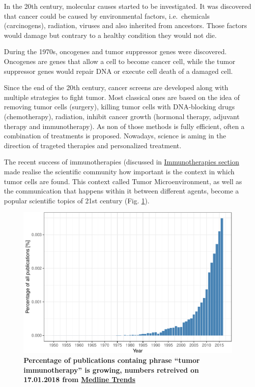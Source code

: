 \documentclass[12pt,]{book}
\theoremstyle{definition}
\theoremstyle{definition}
\theoremstyle{definition}
\theoremstyle{remark}
\begin{document}
In the 20th century, molecular causes started to be investigated. It was
discovered that cancer could be caused by environmental factors,
i.e.~chemicals (carcinogens), radiation, viruses and also inherited from
ancestors. Those factors would damage but contrary to a healthy
condition they would not die.

During the 1970s, oncogenes and tumor suppressor genes were discovered.
Oncogenes are genes that allow a cell to become cancer cell, while the
tumor suppressor genes would repair DNA or execute cell death of a
damaged cell.

Since the end of the 20th century, cancer screens are developed along
with multiple strategies to fight tumor. Most classical ones are based
on the idea of removing tumor cells (surgery), killing tumor cells with
DNA-blocking drugs (chemotherapy), radiation, inhibit cancer growth
(hormonal therapy, adjuvant therapy and immunotherapy). As non of those
methods is fully efficient, often a combination of treatments is
proposed. Nowadays, science is aming in the direction of trageted
therapies and personalized treatment.

The recent success of immunotherapies (discussed in
\protect\hyperlink{immunotherapies}{Immunotherapies section} made
realise the scientific community how important is the context in which
tumor cells are found. This context called Tumor Microenvironment, as
well as the communication that happens within it between different
agents, become a popular scientific topics of 21st century (Fig.
\ref{fig:pubmedTME}).

\begin{figure}

{\centering \includegraphics[width=0.7\linewidth]{UCzPhDThesis_files/figure-latex/pubmedTME-1} 

}

\caption{\textbf{Percentage of publications containg
phrase ``tumor immunotherapy'' is growing, numbers retreived on
17.01.2018 from \href{http://dan.corlan.net/medline-trend.html}{Medline
Trends} \citep{Corlan2004}}}\label{fig:pubmedTME}
\end{figure}
\end{document}
